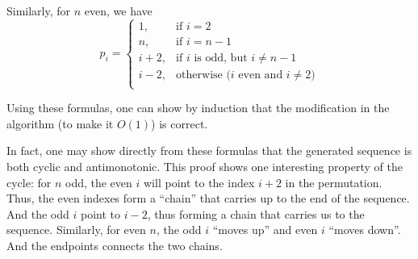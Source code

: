 \documentclass{article}
\begin{document}
Similarly, for $n$ even, we have
\begin{equation*}
    p_i = \begin{cases}
        1, &\text{if $i = 2$} \\
        n, &\text{if $i = n-1$} \\
        i + 2, &\text{if $i$ is odd, but $i \neq n-1$} \\
        i - 2, &\text{otherwise ($i$ even and $i \neq 2$)} \\
    \end{cases}
\end{equation*}

Using these formulas, one can show by induction that
the modification in the algorithm (to make it $O(1)$) is correct.

In fact, one may show directly from these formulas
that the generated sequence is both cyclic and antimonotonic.
This proof shows one interesting property of the cycle:
for $n$ odd, the even $i$ will point to the index $i+2$ in the permutation.
Thus, the even indexes form a ``chain''
that carries up to the end of the sequence.
And the odd $i$ point to $i-2$,
thus forming a chain that carries us to the sequence.
Similarly, for even $n$, the odd $i$ ``moves up'' and even $i$ ``moves down''.
And the endpoints connects the two chains.
\end{document}
